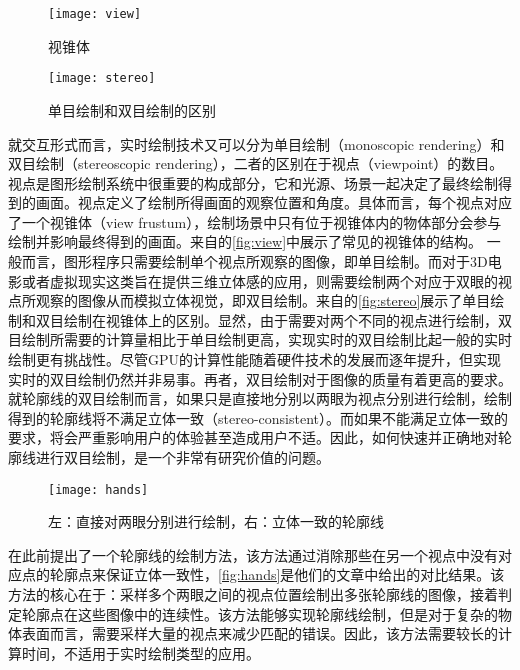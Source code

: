 \begin{figure}[!t]
    \centering
    \texttt{[image: view]}
    \caption{\label{fig:view}
    视锥体}
\end{figure}

\begin{figure}[!b]
    \centering
    \texttt{[image: stereo]}
    \caption{\label{fig:stereo}
    单目绘制和双目绘制的区别}
\end{figure}

就交互形式而言，实时绘制技术又可以分为单目绘制（monoscopic rendering）和双目绘制（stereoscopic rendering），二者的区别在于视点（viewpoint）的数目。视点是图形绘制系统中很重要的构成部分，它和光源、场景一起决定了最终绘制得到的画面。视点定义了绘制所得画面的观察位置和角度。具体而言，每个视点对应了一个视锥体（view frustum），绘制场景中只有位于视锥体内的物体部分会参与绘制并影响最终得到的画面。来自\cite{learnopengl}的\autoref{fig:view}中展示了常见的视锥体的结构。
一般而言，图形程序只需要绘制单个视点所观察的图像，即单目绘制。而对于3D电影或者虚拟现实这类旨在提供三维立体感的应用，则需要绘制两个对应于双眼的视点所观察的图像从而模拟立体视觉，即双目绘制。来自\cite{topicsinopengl}的\autoref{fig:stereo}展示了单目绘制和双目绘制在视锥体上的区别。显然，由于需要对两个不同的视点进行绘制，双目绘制所需要的计算量相比于单目绘制更高，实现实时的双目绘制比起一般的实时绘制更有挑战性。尽管GPU的计算性能随着硬件技术的发展而逐年提升，但实现实时的双目绘制仍然并非易事。再者，双目绘制对于图像的质量有着更高的要求。就轮廓线的双目绘制而言，如果只是直接地分别以两眼为视点分别进行绘制，绘制得到的轮廓线将不满足立体一致（stereo-consistent）。而如果不能满足立体一致的要求，将会严重影响用户的体验甚至造成用户不适。因此，如何快速并正确地对轮廓线进行双目绘制，是一个非常有研究价值的问题。

\begin{figure}[!t]
    \centering
    \texttt{[image: hands]}
    \caption{\label{fig:hands}
    左：直接对两眼分别进行绘制，右：立体一致的轮廓线}
\end{figure}

\citeauthor{kim2013stereoscopic}在此前提出了一个\stc{}轮廓线的绘制方法\cite{kim2013stereoscopic}，该方法通过消除那些在另一个视点中没有对应点的轮廓点来保证立体一致性，\autoref{fig:hands}是他们的文章中给出的对比结果。该方法的核心在于：采样多个两眼之间的视点位置绘制出多张轮廓线的图像，接着判定轮廓点在这些图像中的连续性。该方法能够实现\stc{}轮廓线绘制，但是对于复杂的物体表面而言，需要采样大量的视点来减少匹配的错误。因此，该方法需要较长的计算时间，不适用于实时绘制类型的应用。


